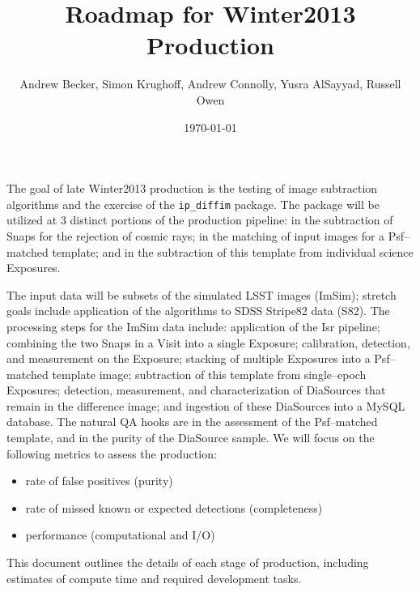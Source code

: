 \documentclass[prd, nofootinbib, floatfix, 11pt,tightenlines,times]{article}
\author{Andrew Becker, Simon Krughoff, Andrew Connolly, Yusra AlSayyad, Russell Owen}
\title{Roadmap for Winter2013 Production}
\date{\today}
\begin{document}
\maketitle

The goal of late Winter2013 production is the testing of image
subtraction algorithms and the exercise of the {\tt ip\_diffim}
package.  The package will be utilized at 3 distinct portions of the
production pipeline: in the subtraction of Snaps for the rejection of
cosmic rays; in the matching of input images for a Psf--matched
template; and in the subtraction of this template from individual
science Exposures.

The input data will be subsets of the simulated LSST images (ImSim);
stretch goals include application of the algorithms to SDSS Stripe82
data (S82).  The processing steps for the ImSim data include:
application of the Isr pipeline; combining the two Snaps in a Visit
into a single Exposure; calibration, detection, and measurement on the
Exposure; stacking of multiple Exposures into a Psf--matched template
image; subtraction of this template from single--epoch Exposures;
detection, measurement, and characterization of DiaSources that remain
in the difference image; and ingestion of these DiaSources into a
MySQL database.  The natural QA hooks are in the assessment of the
Psf--matched template, and in the purity of the DiaSource sample.  We
will focus on the following metrics to assess the production:
\begin{itemize}
\item rate of false positives (purity)
\item rate of missed known or expected detections (completeness)
\item performance (computational and I/O)
\end{itemize}
This document outlines the details of each stage of production, 
including estimates of compute time and required development tasks.

\clearpage
\tableofcontents
\clearpage

\end{document}
